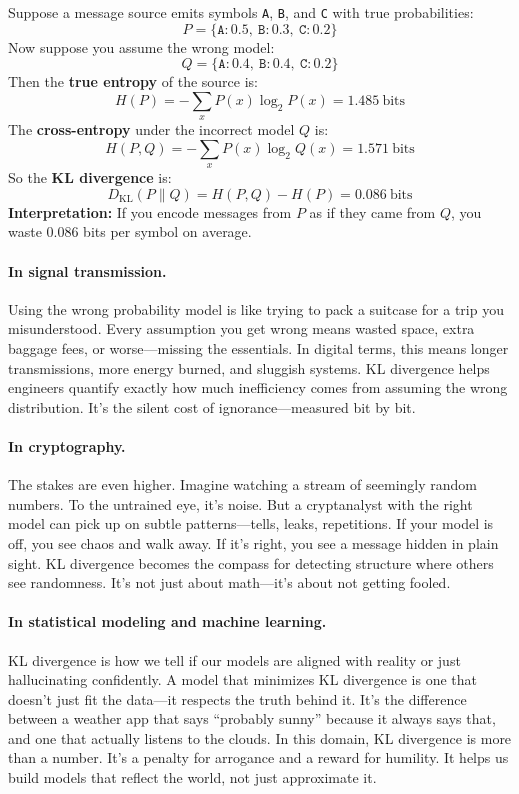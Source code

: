 \begin{example}[title=Extra Bits from the Wrong Model]
Suppose a message source emits symbols \texttt{A}, \texttt{B}, and \texttt{C} with true probabilities:
\[
P = \{ \texttt{A}: 0.5,\ \texttt{B}: 0.3,\ \texttt{C}: 0.2 \}
\]
Now suppose you assume the wrong model:
\[
Q = \{ \texttt{A}: 0.4,\ \texttt{B}: 0.4,\ \texttt{C}: 0.2 \}
\]
Then the \textbf{true entropy} of the source is:
\[
H(P) = -\sum_x P(x) \log_2 P(x) = 1.485\ \text{bits}
\]
The \textbf{cross-entropy} under the incorrect model \( Q \) is:
\[
H(P, Q) = -\sum_x P(x) \log_2 Q(x) = 1.571\ \text{bits}
\]
So the \textbf{KL divergence} is:
\[
D_{\mathrm{KL}}(P \parallel Q) = H(P, Q) - H(P) = 0.086\ \text{bits}
\]
\textbf{Interpretation:} If you encode messages from \( P \) as if they came from \( Q \), you waste 0.086 bits per symbol on average.
\end{example}

\vspace{1em}

\paragraph{In signal transmission.} Using the wrong probability model is like trying to pack a suitcase for a trip you misunderstood. Every assumption you get wrong means wasted space, extra baggage fees, or worse—missing the essentials. In digital terms, this means longer transmissions, more energy burned, and sluggish systems. KL divergence helps engineers quantify exactly how much inefficiency comes from assuming the wrong distribution. It's the silent cost of ignorance—measured bit by bit.

\paragraph{In cryptography.} The stakes are even higher. Imagine watching a stream of seemingly random numbers. To the untrained eye, it's noise. But a cryptanalyst with the right model can pick up on subtle patterns—tells, leaks, repetitions. If your model is off, you see chaos and walk away. If it’s right, you see a message hidden in plain sight. KL divergence becomes the compass for detecting structure where others see randomness. It's not just about math—it's about not getting fooled.

\paragraph{In statistical modeling and machine learning.} KL divergence is how we tell if our models are aligned with reality or just hallucinating confidently. A model that minimizes KL divergence is one that doesn't just fit the data—it respects the truth behind it. It's the difference between a weather app that says “probably sunny” because it always says that, and one that actually listens to the clouds. In this domain, KL divergence is more than a number. It's a penalty for arrogance and a reward for humility. It helps us build models that reflect the world, not just approximate it.





